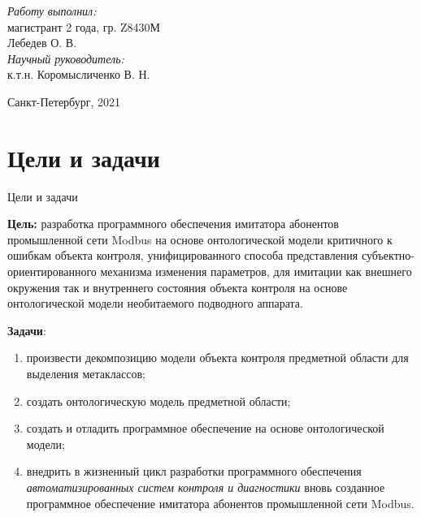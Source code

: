 \begin{frame}
    \setcounter{framenumber}{1}
    \begin{center}
        {\thesisOrganization}
    \end{center}
    
    \begin{center}
        \vspace{10mm}\textbf{\thesisTitle}
    \end{center}
    
    \begin{flushright}
        \vspace{5mm}\emph{Работу выполнил:}\\магистрант 2 года, гр. Z8430М\\
        Лебедев О. В.\\%
        \emph{Научный руководитель:}\\
        к.т.н. Коромысличенко В. Н.
    \end{flushright}
    
    \begin{center}
        \vspace{20mm}\small{Санкт-Петербург, 2021}
    \end{center}
\end{frame}


\section{Цели и задачи}
\begin{frame}{Цели и задачи}

    \textbf{Цель:}
        разработка программного обеспечения имитатора абонентов промышленной сети Modbus
        на основе онтологической модели критичного к ошибкам объекта контроля,
        унифицированного способа представления субъектно-ориентированного механизма изменения параметров,
        для имитации как внешнего окружения так и внутреннего состояния объекта
        контроля на основе онтологической модели необитаемого подводного аппарата.

    \textbf{Задачи}:
    \begin{enumerate}
        \item произвести декомпозицию модели объекта контроля предметной области для выделения метаклассов;
        \item создать онтологическую модель предметной области;
        \item создать и отладить программное обеспечение на основе онтологической модели;
        \item внедрить в жизненный цикл разработки программного обеспечения \textit{автоматизированных систем контроля и диагностики}
              вновь созданное программное обеспечение имитатора абонентов промышленной сети Modbus.
    \end{enumerate}
\end{frame}

